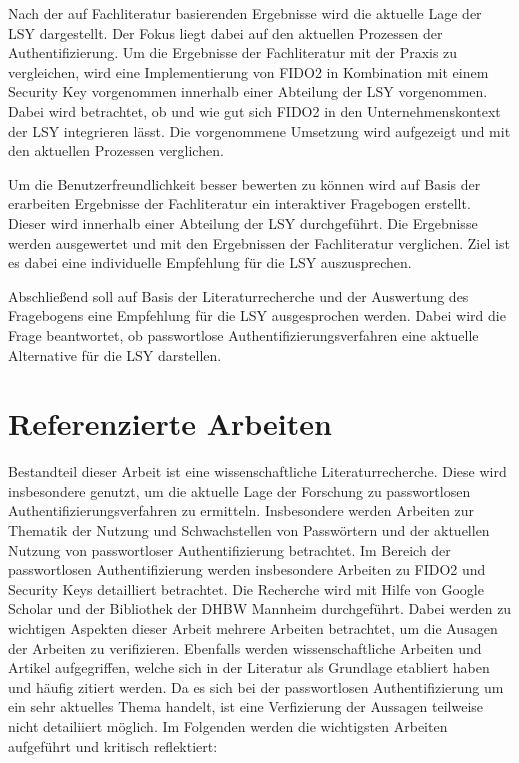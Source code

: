 Nach der auf Fachliteratur basierenden Ergebnisse wird die aktuelle Lage der \ac{LSY} dargestellt. Der Fokus liegt dabei auf den aktuellen Prozessen der Authentifizierung. Um die Ergebnisse der Fachliteratur mit der Praxis zu vergleichen, wird eine Implementierung von FIDO2 in Kombination mit einem Security Key vorgenommen innerhalb einer Abteilung der \ac{LSY} vorgenommen. Dabei wird betrachtet, ob und wie gut sich FIDO2 in den Unternehmenskontext der \ac{LSY} integrieren lässt. Die vorgenommene Umsetzung wird aufgezeigt und mit den aktuellen Prozessen verglichen.

Um die Benutzerfreundlichkeit besser bewerten zu können wird auf Basis der erarbeiten Ergebnisse der Fachliteratur ein interaktiver Fragebogen erstellt. Dieser wird innerhalb einer Abteilung der \ac{LSY} durchgeführt. Die Ergebnisse werden ausgewertet und mit den Ergebnissen der Fachliteratur verglichen. Ziel ist es dabei eine individuelle Empfehlung für die \ac{LSY} auszusprechen.

Abschließend soll auf Basis der Literaturrecherche und der Auswertung des Fragebogens eine Empfehlung für die \ac{LSY} ausgesprochen werden. Dabei wird die Frage beantwortet, ob passwortlose Authentifizierungsverfahren eine aktuelle Alternative für die \ac{LSY} darstellen.

\section{Referenzierte Arbeiten}

Bestandteil dieser Arbeit ist eine wissenschaftliche Literaturrecherche. Diese wird insbesondere genutzt, um die aktuelle Lage der Forschung zu passwortlosen Authentifizierungsverfahren zu ermitteln. Insbesondere werden Arbeiten zur Thematik der Nutzung und Schwachstellen von Passwörtern und der aktuellen Nutzung von passwortloser Authentifizierung betrachtet. Im Bereich der passwortlosen Authentifizierung werden insbesondere Arbeiten zu FIDO2 und Security Keys detailliert betrachtet. Die Recherche wird mit Hilfe von Google Scholar und der Bibliothek der DHBW Mannheim durchgeführt. Dabei werden zu wichtigen Aspekten dieser Arbeit mehrere Arbeiten betrachtet, um die Ausagen der Arbeiten zu verifizieren. Ebenfalls werden wissenschaftliche Arbeiten und Artikel aufgegriffen, welche sich in der Literatur als Grundlage etabliert haben und häufig zitiert werden. Da es sich bei der passwortlosen Authentifizierung um ein sehr aktuelles Thema handelt, ist eine Verfizierung der Aussagen teilweise nicht detailiiert möglich. Im Folgenden werden die wichtigsten Arbeiten aufgeführt und kritisch reflektiert:

